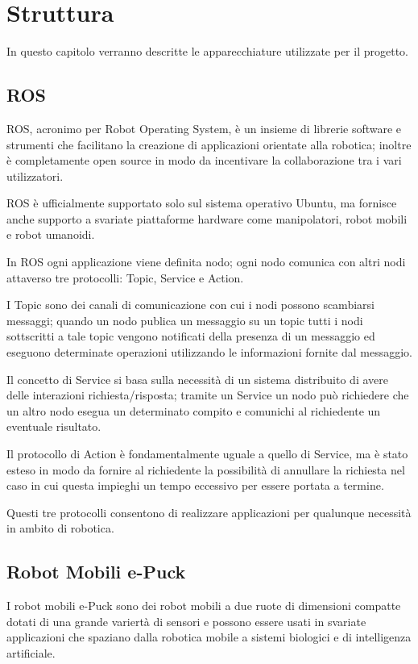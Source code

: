 \chapter{Struttura}
   In questo capitolo verranno descritte le apparecchiature utilizzate per il progetto.
\section{ROS}
	ROS, acronimo per Robot Operating System, \`e un insieme di librerie software e strumenti che facilitano la creazione di applicazioni orientate alla robotica; inoltre \`e completamente open source in modo da incentivare la collaborazione tra i vari utilizzatori.
	
	ROS \`e ufficialmente supportato solo sul sistema operativo Ubuntu, ma fornisce anche supporto a svariate piattaforme hardware come manipolatori, robot mobili e robot umanoidi.
	
	In ROS ogni applicazione viene definita nodo; ogni nodo comunica con altri nodi attaverso tre protocolli: Topic, Service e Action.
	
	I Topic sono dei canali di comunicazione con cui i nodi possono scambiarsi messaggi; quando un nodo publica un messaggio su un topic tutti i nodi sottscritti a tale topic vengono notificati della presenza di un messaggio ed eseguono determinate operazioni utilizzando le informazioni fornite dal messaggio.
	
	Il concetto di Service si basa sulla necessit\`a di un sistema distribuito di avere delle interazioni richiesta/risposta; tramite un Service un nodo può richiedere che un altro nodo esegua un determinato compito e comunichi al richiedente un eventuale risultato.
	
	Il protocollo di Action \`e fondamentalmente uguale a quello di Service, ma è stato esteso in modo da fornire al richiedente la possibilit\`a di annullare la richiesta nel caso in cui questa impieghi un tempo eccessivo per essere portata a termine.
	
	Questi tre protocolli consentono di realizzare applicazioni per qualunque necessit\`a in ambito di robotica.
	
\section{Robot Mobili e-Puck}
	I robot mobili e-Puck sono dei robot mobili a due ruote di dimensioni compatte dotati di una grande variert\`a di sensori e possono essere usati in svariate applicazioni che spaziano dalla robotica mobile a sistemi biologici e di intelligenza artificiale.
	
